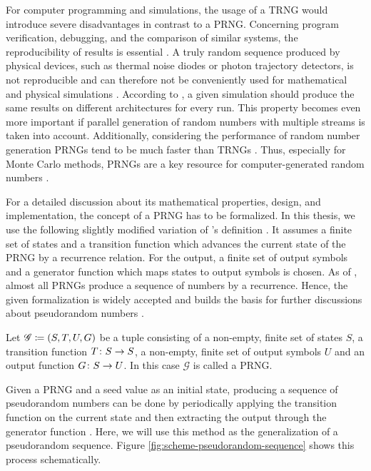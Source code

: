 \documentclass{stdlocal}
\begin{document}
  For computer programming and simulations, the usage of a TRNG would introduce severe disadvantages in contrast to a PRNG.
  Concerning program verification, debugging, and the comparison of similar systems, the reproducibility of results is essential \autocite{lecuyer2015}.
  A truly random sequence produced by physical devices, such as thermal noise diodes or photon trajectory detectors, is not reproducible and can therefore not be conveniently used for mathematical and physical simulations \autocite{lecuyer2015}.
  According to \textcite{lecuyer2015}, a given simulation should produce the same results on different architectures for every run.
  This property becomes even more important if parallel generation of random numbers with multiple streams is taken into account.
  Additionally, considering the performance of random number generation PRNGs tend to be much faster than TRNGs \autocite{intel-drng}.
  Thus, especially for Monte Carlo methods, PRNGs are a key resource for computer-generated random numbers \autocite{bauke2007}.

  For a detailed discussion about its mathematical properties, design, and implementation, the concept of a PRNG has to be formalized.
  In this thesis, we use the following slightly modified variation of \citeauthor{lecuyer1994}'s definition \autocite{lecuyer1994,lecuyer2015,barash2017,bauke2007}.
  It assumes a finite set of states and a transition function which advances the current state of the PRNG by a recurrence relation.
  For the output, a finite set of output symbols and a generator function which maps states to output symbols is chosen.
  As of \textcite{bauke2007}, almost all PRNGs produce a sequence of numbers by a recurrence.
  Hence, the given formalization is widely accepted and builds the basis for further discussions about pseudorandom numbers \autocite{lecuyer1994,lecuyer2015,barash2017,bauke2007}.

  \begin{definition}
    Let $\mathscr{G}\coloneqq (S,T,U,G)$ be a tuple consisting of a non-empty, finite set of states $S$, a transition function $T\colon S\to S$, a non-empty, finite set of output symbols $U$ and an output function $G\colon S\to U$.
    In this case $\mathscr{G}$ is called a PRNG.
  \end{definition}
  Given a PRNG and a seed value as an initial state, producing a sequence of pseudorandom numbers can be done by periodically applying the transition function on the current state and then extracting the output through the generator function \autocite{barash2017,lecuyer1994,lecuyer2015}.
  Here, we will use this method as the generalization of a pseudorandom sequence.
  Figure \ref{fig:scheme-pseudorandom-sequence} shows this process schematically.
\end{document}
